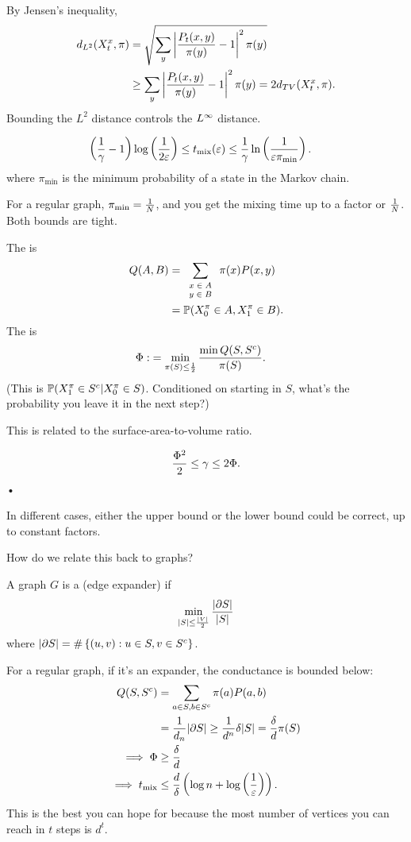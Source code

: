 By Jensen's inequality,
\begin{align}
d_{L^2} (X_t^x, \pi) &=\sqrt{
\sum_y \left| {\frac{P_t(x,y)}{\pi(y)}-1} \right|^2 \pi(y)
}\\
&\ge \sum_y \left| {\frac{P_t(x,y)}{\pi(y)}-1} \right|^2\pi(y) = 2d_{TV}(X_t^x,\pi).
\end{align}
Bounding the $L^2$ distance controls the $L^\infty$ distance. 
\begin{thm}
\begin{align}
\left( {\frac{1}{\gamma}-1} \right) \log \left( {\frac{1}{2\varepsilon}} \right)
&\le 
t_{\text{mix}}(\varepsilon)
\le \frac{1}{\gamma}\ln \left( {\frac{1}{\varepsilon\pi_{\min}}} \right).
\end{align}
where $\pi_{\min}$ is the minimum probability of a state in the Markov chain.
\end{thm}
For a regular graph, $\pi_{\min}=\frac{1}{N}$, and you get the mixing time up to a factor or $\frac{1}{N}$. Both bounds are tight.
\begin{df}
The  is
\begin{align}
Q(A,B) &= \sum_{\scriptsize \begin{array}{c}{x\in A}\\{y\in B}\end{array}} \pi(x) P(x,y)\\
&=\mathbb{P}(X_0^\pi\in A, X_1^\pi\in B).
\end{align}
The  is
\begin{align}
\Phi:&= \min_{\pi(S)\le \frac{1}{2}}\frac{\min Q(S,S^c)}{\pi(S)}.
\end{align}
(This is $\mathbb{P}(X_1^\pi \in S^c|X_0^\pi\in S)$. Conditioned on starting in $S$, what's the probability you leave it in the next step?)
\end{df}
This is related to the surface-area-to-volume ratio.

\begin{thm}
\begin{align}
\frac{\Phi^2}{2} \le \gamma\le 2\Phi.
\end{align}•
\end{thm}
In different cases, either the upper bound or the lower bound could be correct, up to constant factors.

How do we relate this back to graphs? 
\begin{df}
A graph $G$ is a  (edge expander) if
\begin{align}
\min_{|S|\le \frac{|V|}{2}}
\frac{|\partial S|}{|S|} 
\end{align}
where $|\partial S|=\#\left\{{(u,v)}:{u\in S, v\in S^c}\right\}$.
\end{df}
For a regular graph, if it's an expander, the conductance is bounded below:
\begin{align}
Q(S,S^c) &= \sum_{a\in S, b\in S^c} \pi(a)P(a,b)
\\
&=\frac{1}{d_n}|\partial S| \ge \frac{1}{d^n} \delta|S| = \frac{\delta}{d}\pi(S)\\
\implies \Phi &\ge \frac{\delta}{d}\\
\implies t_{\text{mix}} &\le
\frac{d}{\delta} \left( {\log n + \log \left( {\frac{1}{\varepsilon}} \right)} \right).
\end{align}
This is the best you can hope for because the most number of vertices you can reach in $t$ steps is $d^t$.


